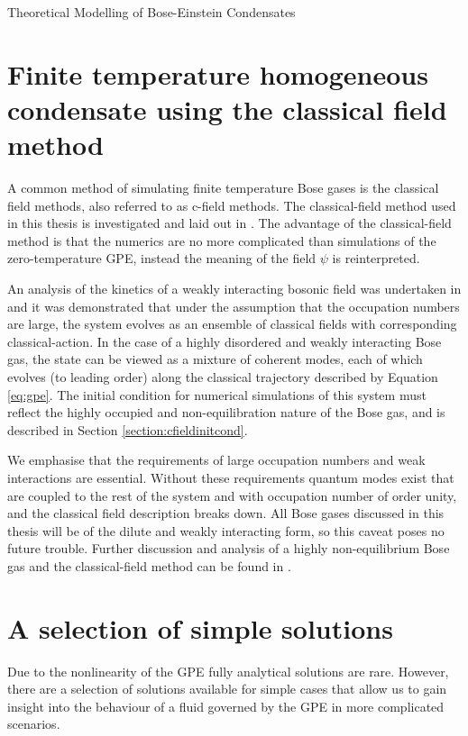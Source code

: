\begin{chapter}{\label{cha:theoretical_model}Theoretical Modelling of Bose-Einstein Condensates}
\section{\label{section:cfield} Finite temperature homogeneous condensate using the classical field method}

A common method of simulating finite temperature Bose gases is the classical field methods, also referred to as c-field methods. The classical-field method used in this thesis is investigated and laid out in \cite{PhysRevA.66.013603}. The advantage of the classical-field method is that the numerics are no more complicated than simulations of the zero-temperature GPE, instead the meaning of the field $\psi$ is reinterpreted.

An analysis of the kinetics of a weakly interacting bosonic field was undertaken in \cite{PhysRev.147.214} and it was demonstrated that under the assumption that the occupation numbers are large, the system evolves as an ensemble of classical fields with corresponding classical-action. In the case of a highly disordered and weakly interacting Bose gas, the state can be viewed as a mixture of coherent modes, each of which evolves (to leading order) along the classical trajectory described by Equation \ref{eq:gpe}. The initial condition for numerical simulations of this system must reflect the highly occupied and non-equilibration nature of the Bose gas, and is described in Section \ref{section:cfieldinitcond}.

We emphasise that the requirements of large occupation numbers and weak interactions are essential. Without these requirements quantum modes exist that are coupled to the rest of the system and with occupation number of order unity, and the classical field description breaks down. All Bose gases discussed in this thesis will be of the dilute and weakly interacting form, so this caveat poses no future trouble. Further discussion and analysis of a highly non-equilibrium Bose gas and the classical-field method can be found in \cite{PhysRevA.66.013603}.

\section{\label{section:solutions} A selection of simple solutions}
	Due to the nonlinearity of the GPE fully analytical solutions are rare. However, there are a selection of solutions available for simple cases that allow us to gain insight into the behaviour of a fluid governed by the GPE in more complicated scenarios.

\end{chapter}
